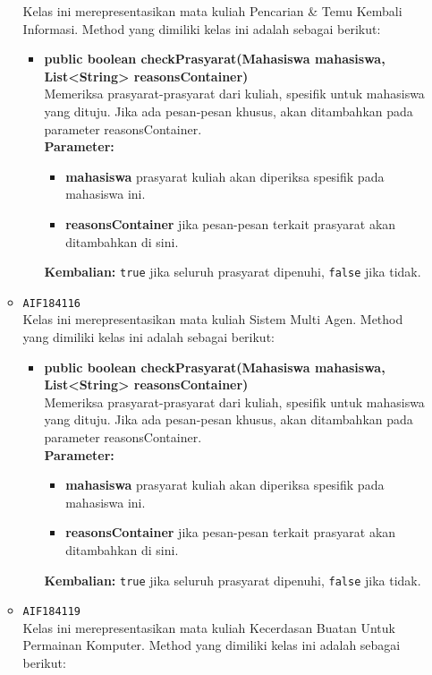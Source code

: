 \begin{enumerate}
\begin{itemize}
Kelas ini merepresentasikan mata kuliah Pencarian \& Temu Kembali Informasi. Method yang dimiliki kelas ini adalah sebagai berikut: 
\begin{itemize}
\item \textbf{public boolean checkPrasyarat(Mahasiswa mahasiswa, List<String> reasonsContainer)}\\
Memeriksa prasyarat-prasyarat dari kuliah, spesifik untuk mahasiswa yang dituju. Jika ada pesan-pesan khusus, akan ditambahkan pada parameter reasonsContainer.\\
\textbf{Parameter:}
\begin{itemize}
\item \textbf{mahasiswa} prasyarat kuliah akan diperiksa spesifik pada mahasiswa ini.
\item \textbf{reasonsContainer} jika pesan-pesan terkait prasyarat akan ditambahkan di sini.
\end{itemize}
\textbf{Kembalian:} \texttt{true} jika seluruh prasyarat dipenuhi, \texttt{false} jika tidak.
\end{itemize}
\item \texttt{AIF184116} \\
Kelas ini merepresentasikan mata kuliah Sistem Multi Agen. Method yang dimiliki kelas ini adalah sebagai berikut: 
\begin{itemize}
\item \textbf{public boolean checkPrasyarat(Mahasiswa mahasiswa, List<String> reasonsContainer)}\\
Memeriksa prasyarat-prasyarat dari kuliah, spesifik untuk mahasiswa yang dituju. Jika ada pesan-pesan khusus, akan ditambahkan pada parameter reasonsContainer.\\
\textbf{Parameter:}
\begin{itemize}
\item \textbf{mahasiswa} prasyarat kuliah akan diperiksa spesifik pada mahasiswa ini.
\item \textbf{reasonsContainer} jika pesan-pesan terkait prasyarat akan ditambahkan di sini.
\end{itemize}
\textbf{Kembalian:} \texttt{true} jika seluruh prasyarat dipenuhi, \texttt{false} jika tidak.
\end{itemize}
\item \texttt{AIF184119} \\
Kelas ini merepresentasikan mata kuliah Kecerdasan Buatan Untuk Permainan Komputer. Method yang dimiliki kelas ini adalah sebagai berikut: 
\begin{itemize}

\end{itemize}
\end{itemize}
\end{enumerate}
